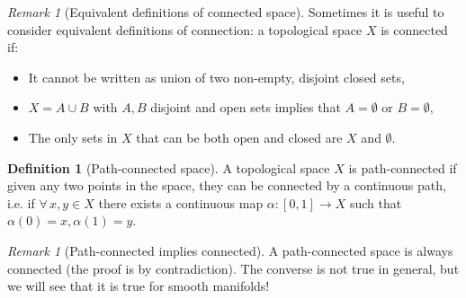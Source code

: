 \documentclass[a4paper,11pt,titlepage, article, oneside]{memoir}
\numberwithin{equation}{section}
\theoremstyle{definition}
\newtheorem{definition}[theorem]{Definition}
\theoremstyle{remark}
\newtheorem{remark}[theorem]{Remark}
\begin{document}
\begin{remarkbox}
\begin{remark}[Equivalent definitions of connected space]
Sometimes it is useful to consider equivalent definitions of connection: a topological space $X$ is connected if:
\begin{itemize}
\item It cannot be written as union of two non-empty, disjoint closed sets,
\item $X = A \cup B$ with $A, B$ disjoint and open sets implies that $A= \emptyset$ or $B = \emptyset$,
\item The only sets in $X$ that can be both open and closed are $X$ and $\emptyset$.
\end{itemize}
\end{remark}
\end{remarkbox}

\begin{definition}[Path-connected space]
A topological space $X$ is path-connected if given any two points in the space, they can be connected by a continuous path, i.e. if $\forall\, x, y \in X$ there exists a continuous map $\alpha \colon [0,1] \rightarrow X$ such that $\alpha(0)=x, \alpha(1)=y$.
\end{definition}

\begin{remarkbox}\begin{remark}[Path-connected implies connected]
A path-connected space is always connected (the proof is by contradiction). The converse is not true in general, but we will see that it is true for smooth manifolds!
\end{remark}\end{remarkbox}
\end{document}
